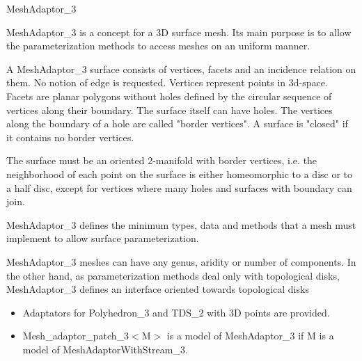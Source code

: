 

\begin{ccRefConcept}{MeshAdaptor_3}



\ccDefinition

MeshAdaptor\_3 is a concept for a 3D surface mesh. Its main purpose is to allow the parameterization methods to access meshes on an uniform manner.

A MeshAdaptor\_3 surface consists of vertices, facets and an incidence relation on them. No notion of edge is requested. Vertices represent points in 3d-space. Facets are planar polygons without holes defined by the circular sequence of vertices along their boundary. The surface itself can have holes. The vertices along the boundary of a hole are called "border vertices". A surface is "closed" if it contains no border vertices.

The surface must be an oriented 2-manifold with border vertices, i.e. the neighborhood of each point on the surface is either homeomorphic to a disc or to a half disc, except for vertices where many holes and surfaces with boundary can join.

MeshAdaptor\_3 defines the minimum types, data and methods that a mesh must implement to allow surface parameterization.

MeshAdaptor\_3 meshes can have any genus, aridity or number of components. In the other hand, as parameterization methods deal only with topological disks, MeshAdaptor\_3 defines an interface oriented towards topological disks


\ccHasModels

\begin{itemize}
\item Adaptators for Polyhedron\_3 and TDS\_2 with 3D points are provided.\item Mesh\_adaptor\_patch\_3$<$M$>$ is a model of MeshAdaptor\_3 if M is a model of MeshAdaptorWithStream\_3.\end{itemize}




\end{ccRefConcept}
